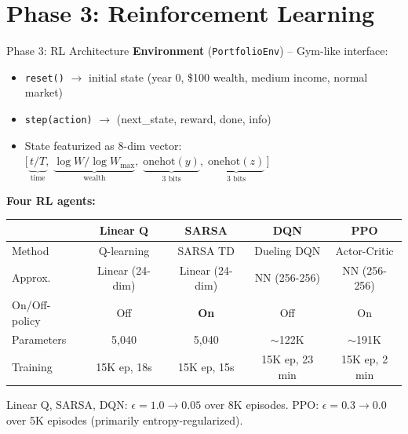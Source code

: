 \documentclass[aspectratio=169, 11pt]{beamer}
\begin{document}
\section{Phase 3: Reinforcement Learning}

\begin{frame}{Phase 3: RL Architecture}
\textbf{Environment} (\texttt{PortfolioEnv}) -- Gym-like interface:
\begin{itemize}
    \item \texttt{reset()} $\to$ initial state (year 0, \$100 wealth, medium income, normal market)
    \item \texttt{step(action)} $\to$ (next\_state, reward, done, info)
    \item State featurized as 8-dim vector:
    $\bigl[\,\underbrace{t/T}_{\text{time}},\;\underbrace{\log W / \log W_{\max}}_{\text{wealth}},\;\underbrace{\text{onehot}(y)}_{\text{3 bits}},\;\underbrace{\text{onehot}(z)}_{\text{3 bits}}\,\bigr]$
\end{itemize}

\vspace{0.5em}
\textbf{Four RL agents:}
\begin{center}
\small
\begin{tabular}{lcccc}
\toprule
& \textbf{Linear Q} & \textbf{SARSA} & \textbf{DQN} & \textbf{PPO} \\
\midrule
Method        & Q-learning      & SARSA TD        & Dueling DQN     & Actor-Critic \\
Approx.       & Linear (24-dim) & Linear (24-dim) & NN (256-256)    & NN (256-256) \\
On/Off-policy & Off             & \textbf{On}     & Off             & On \\
Parameters    & 5{,}040         & 5{,}040         & $\sim$122K      & $\sim$191K \\
Training      & 15K ep, 18s     & 15K ep, 15s     & 15K ep, 23 min  & 15K ep, 2 min \\
\bottomrule
\end{tabular}
\end{center}

\vspace{0.3em}
Linear Q, SARSA, DQN: $\epsilon = 1.0 \to 0.05$ over 8K episodes.
PPO: $\epsilon = 0.3 \to 0.0$ over 5K episodes (primarily entropy-regularized).
\end{frame}
\end{document}
